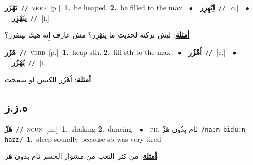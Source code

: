 \documentclass[10pt,a4paper,twoside]{article} %
\begin{document}
\begin{multicols}{2}
{\setlength\topsep{0pt}\textbf{\foreignlanguage{arabic}{نَهْزَر}}\ {\color{gray}\texttt{//}\color{black}}\ \textsc{verb}\ [p.]\ \textbf{1.}~be heaped.  \textbf{2.}~be filled to the max\ \ $\bullet$\ \ \setlength\topsep{0pt}\textbf{\foreignlanguage{arabic}{اِنْهِزِر}}\ {\color{gray}\texttt{//}\color{black}}\ [c.]\ \ $\bullet$\ \ \setlength\topsep{0pt}\textbf{\foreignlanguage{arabic}{ينَهْزِر}}\ {\color{gray}\texttt{//}\color{black}}\ [i.]\  \begin{flushright}\color{gray}\foreignlanguage{arabic}{\textbf{\underline{\foreignlanguage{arabic}{أمثلة}}}: ليش تركته لحديت ما ينَهْزِر؟ مش عارف إِنه هيك بينفزر؟}\end{flushright}\color{black}} \vspace{2mm}

{\setlength\topsep{0pt}\textbf{\foreignlanguage{arabic}{هَزَر}}\ {\color{gray}\texttt{//}\color{black}}\ \textsc{verb}\ [p.]\ \textbf{1.}~heap sth.  \textbf{2.}~fill sth to the max\ \ $\bullet$\ \ \setlength\topsep{0pt}\textbf{\foreignlanguage{arabic}{اُهْزُر}}\ {\color{gray}\texttt{//}\color{black}}\ [c.]\ \ $\bullet$\ \ \setlength\topsep{0pt}\textbf{\foreignlanguage{arabic}{يُهْزُر}}\ {\color{gray}\texttt{//}\color{black}}\ [i.]\  \begin{flushright}\color{gray}\foreignlanguage{arabic}{\textbf{\underline{\foreignlanguage{arabic}{أمثلة}}}: اُهْزُر الكيس لو سمحت}\end{flushright}\color{black}} \vspace{2mm}

\vspace{-3mm}
\subsection*{\color{blue}\foreignlanguage{arabic}{ه.ز.ز}\color{blue}{}} 

{\setlength\topsep{0pt}\textbf{\foreignlanguage{arabic}{هَزّ}}\ {\color{gray}\texttt{//}\color{black}}\ \textsc{noun}\ [m.]\ \textbf{1.}~shaking  \textbf{2.}~dancing\ \ $\bullet$\ \ \textsc{ph.} \color{gray} \foreignlanguage{arabic}{نَام بِدُون هَزّ}\color{black}\ {\color{gray}\texttt{/{\sffamily naːm biduːn hazz}/}\color{black}}\ \textbf{1.}~sleep soundly because sb was very tired\  \begin{flushright}\color{gray}\foreignlanguage{arabic}{\textbf{\underline{\foreignlanguage{arabic}{أمثلة}}}: من كثر التعب من مشوار الجسر نام بدون هَز}\end{flushright}\color{black}} \vspace{2mm}


\end{multicols}
\end{document}
